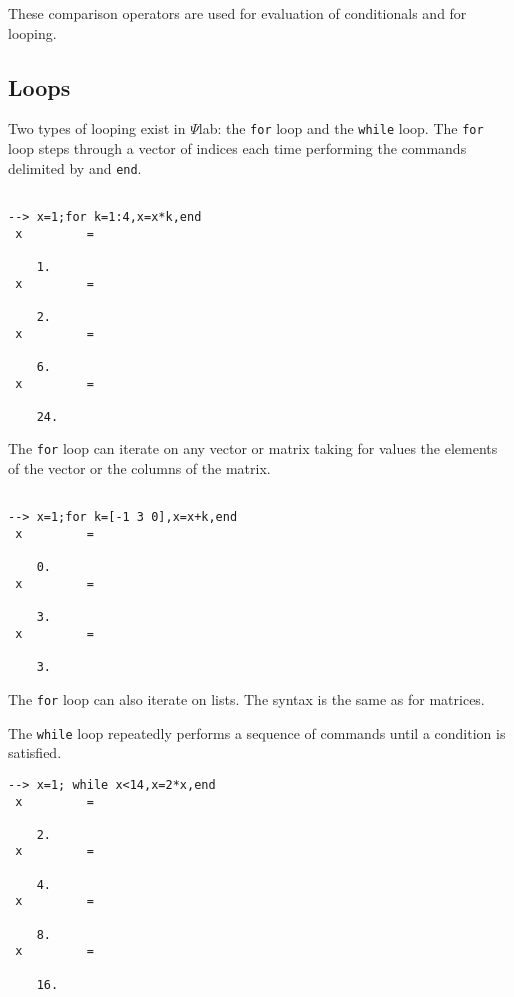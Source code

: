 These comparison operators are used for evaluation
of conditionals and for looping.

\subsection{Loops}
Two types of looping exist in $\Psi$lab: the 
{\tt for} loop
and the 
{\tt while} loop.  The {\tt for} loop
steps through a vector of indices each time performing the
commands delimited by and {\tt end}.  
\begin{verbatim}
 
--> x=1;for k=1:4,x=x*k,end
 x         =
 
    1.  
 x         =
 
    2.  
 x         =
 
    6.  
 x         =
 
    24.  
\end{verbatim}
The {\tt for} loop can iterate on any vector or matrix taking for values
the elements of the vector or the columns of the matrix.
\begin{verbatim}
 
--> x=1;for k=[-1 3 0],x=x+k,end
 x         =
 
    0.  
 x         =
 
    3.  
 x         =
 
    3.  
\end{verbatim}
The {\tt for} loop can also iterate on lists. The syntax is the same as for
matrices.

	The {\tt while} loop repeatedly performs a sequence of commands 
until a condition is satisfied.
\begin{verbatim}
--> x=1; while x<14,x=2*x,end
 x         =
 
    2.  
 x         =
 
    4.  
 x         =
 
    8.  
 x         =
 
    16.  

\end{verbatim}

